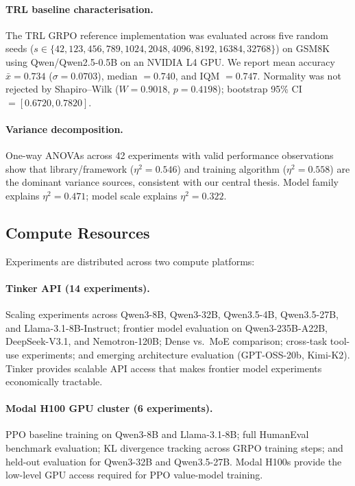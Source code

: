 \documentclass{article}
\begin{document}
\paragraph{TRL baseline characterisation.}
The TRL GRPO reference implementation was evaluated across five random seeds
($s \in \{42, 123, 456, 789, 1024, 2048, 4096, 8192, 16384, 32768\}$) on GSM8K using Qwen/Qwen2.5-0.5B on
an NVIDIA L4 GPU. We report mean accuracy $\bar{x} = 0.734$ ($\sigma = 0.0703$),
median $= 0.740$, and IQM $= 0.747$. Normality was not rejected by Shapiro--Wilk
($W = 0.9018$, $p = 0.4198$); bootstrap 95\% CI $= [0.6720, 0.7820]$.

\paragraph{Variance decomposition.}
One-way ANOVAs across 42 experiments with valid performance observations show
that library/framework ($\eta^2 = 0.546$) and training algorithm ($\eta^2 = 0.558$)
are the dominant variance sources, consistent with our central thesis. Model
family explains $\eta^2 = 0.471$; model scale explains $\eta^2 = 0.322$.

\subsection{Compute Resources}

Experiments are distributed across two compute platforms:

\paragraph{Tinker API (14 experiments).}
Scaling experiments across Qwen3-8B, Qwen3-32B, Qwen3.5-4B, Qwen3.5-27B,
and Llama-3.1-8B-Instruct; frontier model evaluation on Qwen3-235B-A22B,
DeepSeek-V3.1, and Nemotron-120B; Dense vs.~MoE comparison; cross-task
tool-use experiments; and emerging architecture evaluation (GPT-OSS-20b,
Kimi-K2). Tinker provides scalable API access that makes frontier model
experiments economically tractable.

\paragraph{Modal H100 GPU cluster (6 experiments).}
PPO baseline training on Qwen3-8B and Llama-3.1-8B; full HumanEval
benchmark evaluation; KL divergence tracking across GRPO training steps;
and held-out evaluation for Qwen3-32B and Qwen3.5-27B. Modal H100s
provide the low-level GPU access required for PPO value-model training.
\end{document}
